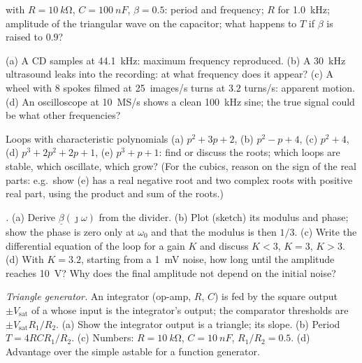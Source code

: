 \begin{exercise}[$\star$]\label{exo:b2:feedback-oscillators:3}
 with $R = \qty{10}{k\ohm}$, $C = \qty{100}{nF}$, $\beta = 0.5$:
period and frequency; $R$ for \qty{1.0}{kHz}; amplitude of the triangular
wave on the capacitor; what happens to $T$ if $\beta$ is raised to $0.9$?
\end{exercise}

\begin{exercise}[$\star$]\label{exo:b2:feedback-oscillators:4}
(a) A CD samples at \qty{44.1}{kHz}: maximum frequency reproduced. (b) A
\qty{30}{kHz} ultrasound leaks into the recording: at what frequency does
it appear? (c) A wheel with $8$ spokes filmed at \qty{25}{images/s} turns
at $3.2$ turns/s: apparent motion. (d) An oscilloscope at \qty{10}{MS/s}
shows a clean \qty{100}{kHz} sine; the true signal could be what other
frequencies?
\end{exercise}

\begin{exercise}[$\star\star$]\label{exo:b2:feedback-oscillators:5}
Loops with characteristic polynomials (a) $p^2 + 3p + 2$, (b) $p^2 - p +
4$, (c) $p^2 + 4$, (d) $p^3 + 2p^2 + 2p + 1$, (e) $p^3 + p + 1$: find or
discuss the roots; which loops are stable, which oscillate, which grow?
(For the cubics, reason on the sign of the real parts: e.g.\ show (e)
has a real negative root and two complex roots with positive real
part, using the product and sum of the roots.)
\end{exercise}

\begin{exercise}[$\star\star$]\label{exo:b2:feedback-oscillators:6}
\emph{.} (a) Derive $\underline\beta(\jmath\omega)$ from the divider.
(b) Plot (sketch) its modulus and phase; show the phase is zero only at
$\omega_0$ and that the modulus is then $1/3$. (c) Write the differential
equation of the loop for a gain $K$ and discuss $K < 3$, $K = 3$, $K > 3$.
(d) With $K = 3.2$, starting from a \qty{1}{mV} noise, how long until the
amplitude reaches \qty{10}{V}? Why does the final amplitude not depend on
the initial noise?
\end{exercise}

\begin{exercise}[$\star\star$]\label{exo:b2:feedback-oscillators:7}
\emph{Triangle generator.} An integrator (op-amp, $R$, $C$) is fed by
the square output $\pm V_{\text{sat}}$ of a  whose input
is the integrator's output; the comparator thresholds are
$\pm V_{\text{sat}}R_1/R_2$. (a) Show the integrator output is a triangle;
its slope. (b) Period $T = 4RCR_1/R_2$. (c) Numbers: $R = \qty{10}{k\ohm}$,
$C = \qty{10}{nF}$, $R_1/R_2 = 0.5$. (d) Advantage over the simple astable
for a function generator.
\end{exercise}

